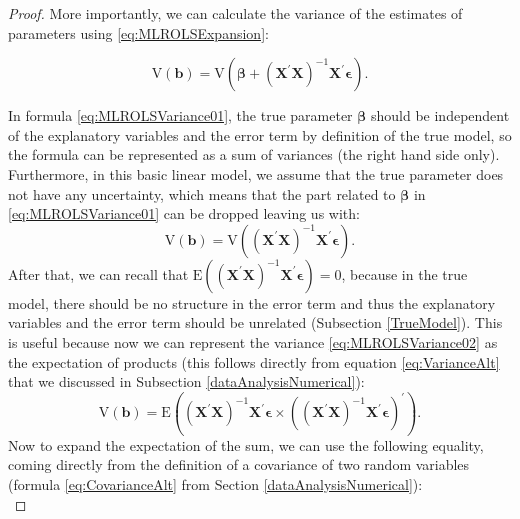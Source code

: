 \documentclass[
]{book}
\theoremstyle{definition}
\theoremstyle{definition}
\theoremstyle{definition}
\theoremstyle{definition}
\theoremstyle{remark}
\begin{document}
\begin{proof}
More importantly, we can calculate the variance of the estimates of parameters using \eqref{eq:MLROLSExpansion}:

\begin{equation}
\mathrm{V}\left( {\boldsymbol{b}} \right) = \mathrm{V}\left( {\boldsymbol{\beta}} + \left( {\mathbf{X}}^\prime {\mathbf{X}} \right)^{-1} {\mathbf{X}}^\prime {\boldsymbol{\epsilon}} \right) .
\label{eq:MLROLSVariance01}
\end{equation}

In formula \eqref{eq:MLROLSVariance01}, the true parameter \(\boldsymbol{\beta}\) should be independent of the explanatory variables and the error term by definition of the true model, so the formula can be represented as a sum of variances (the right hand side only). Furthermore, in this basic linear model, we assume that the true parameter does not have any uncertainty, which means that the part related to \({\boldsymbol{\beta}}\) in \eqref{eq:MLROLSVariance01} can be dropped leaving us with:
\begin{equation}
\mathrm{V}\left( {\boldsymbol{b}} \right) = \mathrm{V}\left(\left( {\mathbf{X}}^\prime {\mathbf{X}} \right)^{-1} {\mathbf{X}}^\prime {\boldsymbol{\epsilon}} \right).
\label{eq:MLROLSVariance02}
\end{equation}
After that, we can recall that \(\mathrm{E}\left(\left( {\mathbf{X}}^\prime {\mathbf{X}} \right)^{-1} {\mathbf{X}}^\prime {\boldsymbol{\epsilon}} \right)=0\), because in the true model, there should be no structure in the error term and thus the explanatory variables and the error term should be unrelated (Subsection \ref{TrueModel}). This is useful because now we can represent the variance \eqref{eq:MLROLSVariance02} as the expectation of products (this follows directly from equation \eqref{eq:VarianceAlt} that we discussed in Subsection \ref{dataAnalysisNumerical}):
\begin{equation*}
\mathrm{V}\left( {\boldsymbol{b}} \right) = \mathrm{E}\left(\left( {\mathbf{X}}^\prime {\mathbf{X}} \right)^{-1} {\mathbf{X}}^\prime {\boldsymbol{\epsilon}} \times \left( \left( {\mathbf{X}}^\prime {\mathbf{X}} \right)^{-1} {\mathbf{X}}^\prime {\boldsymbol{\epsilon}} \right)^\prime \right).
\label{eq:MLROLSVariance03}
\end{equation*}
Now to expand the expectation of the sum, we can use the following equality, coming directly from the definition of a covariance of two random variables (formula \eqref{eq:CovarianceAlt} from Section \ref{dataAnalysisNumerical}):
\begin{equation}

\end{equation}
\end{proof}
\end{document}

